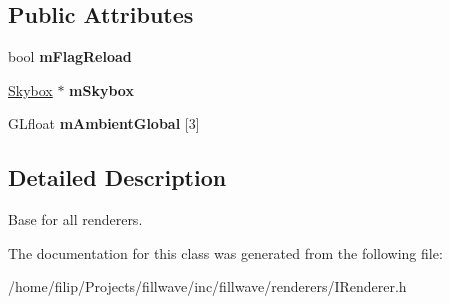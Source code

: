 \subsection*{Public Attributes}
\begin{DoxyCompactItemize}
\item 
bool {\bfseries m\+Flag\+Reload}\hypertarget{classflw_1_1flf_1_1IRenderer_aefe02e2d025ff1ce6e7553c2c1f9b7fa}{}\label{classflw_1_1flf_1_1IRenderer_aefe02e2d025ff1ce6e7553c2c1f9b7fa}

\item 
\hyperlink{classflw_1_1flf_1_1Skybox}{Skybox} $\ast$ {\bfseries m\+Skybox}\hypertarget{classflw_1_1flf_1_1IRenderer_a14ec6383fdb9e4edcc8c27d4290c4cdd}{}\label{classflw_1_1flf_1_1IRenderer_a14ec6383fdb9e4edcc8c27d4290c4cdd}

\item 
G\+Lfloat {\bfseries m\+Ambient\+Global} \mbox{[}3\mbox{]}\hypertarget{classflw_1_1flf_1_1IRenderer_a3e09bfcf3e5c8c6c42dd40b782b7906f}{}\label{classflw_1_1flf_1_1IRenderer_a3e09bfcf3e5c8c6c42dd40b782b7906f}

\end{DoxyCompactItemize}


\subsection{Detailed Description}
Base for all renderers. 

The documentation for this class was generated from the following file\+:\begin{DoxyCompactItemize}
\item 
/home/filip/\+Projects/fillwave/inc/fillwave/renderers/I\+Renderer.\+h\end{DoxyCompactItemize}
